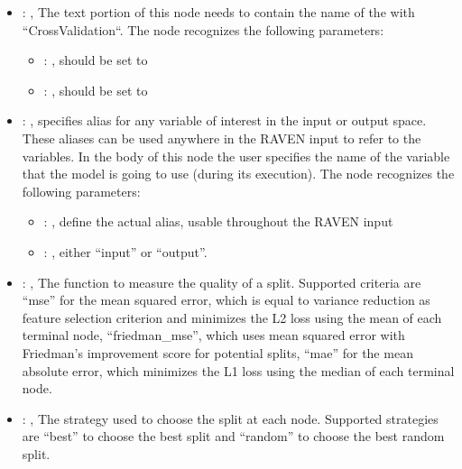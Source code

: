 \begin{itemize}
    \item {}: , 
      The text portion of this node needs to contain the name of the  with
               ``CrossValidation``.
      The  node recognizes the following parameters:
        \begin{itemize}
          \item {}: , 
            should be set to 
          \item {}: , 
            should be set to 
      \end{itemize}

    \item {}: , 
      specifies alias for         any variable of interest in the input or output space. These
      aliases can be used anywhere in the RAVEN input to         refer to the variables. In the body
      of this node the user specifies the name of the variable that the model is going to use
      (during its execution).
      The  node recognizes the following parameters:
        \begin{itemize}
          \item {}: , 
            define the actual alias, usable throughout the RAVEN input
          \item {}: , 
            either ``input'' or ``output''.
      \end{itemize}

    \item {}: , 
      The function to measure the quality of a split. Supported criteria are ``mse'' for the mean
      squared error,                                                  which is equal to variance
      reduction as feature selection criterion and minimizes the L2 loss using the mean of each
      terminal node, ``friedman\_mse'', which uses mean squared error with Friedman's improvement
      score for potential splits,                                                  ``mae'' for the
      mean absolute error, which minimizes the L1 loss using the median of each terminal node.

    \item {}: , 
      The strategy used to choose the split at each node. Supported strategies are ``best''
      to choose the best split and ``random'' to choose the best random split.


\end{itemize}
